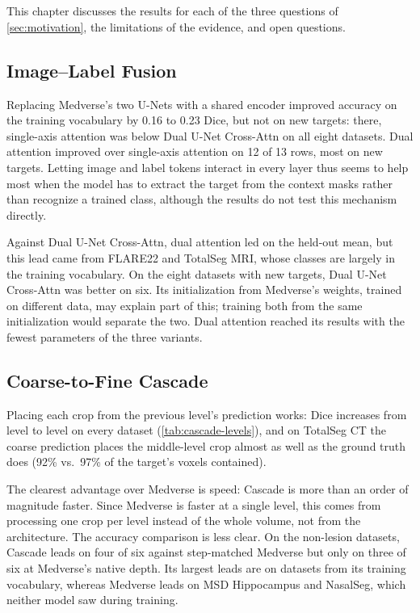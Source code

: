 \section{}\label{sec:discussion}

This chapter discusses the results for each of the three questions of
\autoref{sec:motivation}, the limitations of the evidence, and open questions.

\subsection{Image--Label Fusion}\label{sec:discussion-fusion}

Replacing Medverse's two U-Nets with a shared encoder improved accuracy on the
training vocabulary by 0.16 to 0.23 Dice, but not on new targets: there,
single-axis attention was below Dual U-Net Cross-Attn on all eight datasets.
Dual attention improved over single-axis attention on 12 of 13 rows, most on
new targets. Letting image and label tokens interact in every layer thus seems
to help most when the model has to extract the target from the context masks
rather than recognize a trained class, although the results do not test this
mechanism directly.

Against Dual U-Net Cross-Attn, dual attention led on the held-out mean, but
this lead came from FLARE22 and TotalSeg MRI, whose classes are largely in the
training vocabulary. On the eight datasets with new targets, Dual U-Net
Cross-Attn was better on six. Its initialization from Medverse's weights,
trained on different data, may explain part of this; training both from the
same initialization would separate the two. Dual attention reached its results
with the fewest parameters of the three variants.

\subsection{Coarse-to-Fine Cascade}\label{sec:discussion-cascade}

Placing each crop from the previous level's prediction works: Dice increases
from level to level on every dataset (\autoref{tab:cascade-levels}), and on
TotalSeg CT the coarse prediction places the middle-level crop almost as well
as the ground truth does (92\% vs.\ 97\% of the target's voxels contained).

The clearest advantage over Medverse is speed: Cascade is more than an order
of magnitude faster. Since Medverse is faster at a single level, this comes
from processing one crop per level instead of the whole volume, not from the
architecture. The accuracy comparison is less clear. On the non-lesion datasets, Cascade leads on four of six against step-matched
Medverse but only on three of six at Medverse's native depth. Its largest
leads are on datasets from its training vocabulary, whereas Medverse leads on
MSD Hippocampus and NasalSeg, which neither model saw during training.


